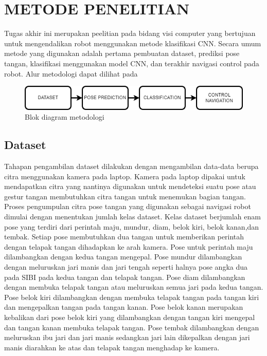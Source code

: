 \chapter{METODE PENELITIAN}
\label{chap:desainimplementasi}


Tugas akhir ini merupakan peelitian pada bidang visi computer yang bertujuan untuk mengendalikan robot menggunakan metode klasifikasi CNN. Secara umum metode yang digunakan adalah pertama pembuatan dataset, prediksi pose tangan, klasifikasi menggunakan model CNN, dan terakhir navigasi control pada robot. Alur metodologi dapat dilihat pada

\begin{figure}[!h]
  \centering
	\includegraphics[width=1\linewidth]{../Gambar/metodologi.png}
	\caption{Blok diagram metodologi}
	\label{fig:metodologi}
\end{figure}

\section{Dataset}
\label{sec:deskripsisistem}

Tahapan pengambilan dataset dilakukan dengan mengambilan data-data berupa citra menggunakan kamera pada laptop. Kamera pada laptop dipakai untuk mendapatkan citra yang nantinya digunakan untuk mendeteksi suatu pose atau gestur tangan membutuhkan citra tangan untuk menemukan bagian tangan. Proses pengumpulan citra pose tangan yang digunakan sebagai navigasi robot  dimulai dengan menentukan jumlah kelas dataset. Kelas dataset berjumlah enam pose yang terdiri dari perintah maju, mundur, diam, belok kiri, belok kanan,dan tembak. Setiap pose membutuhkan dua tangan untuk memberikan perintah dengan telapak tangan dihadapkan ke arah kamera. Pose untuk perintah maju dilambangkan dengan kedua tangan mengepal. Pose mundur dilambangkan dengan meluruskan jari manis dan jari tengah seperti halnya pose angka dua pada SIBI pada kedua tangan dan telapak tangan.  Pose diam dilambangkan dengan membuka telapak tangan atau meluruskan semua jari pada kedua tangan.  Pose belok kiri dilambangkan dengan membuka telapak tangan pada tangan kiri dan mengepalkan tangan pada tangan kanan. Pose belok kanan merupakan kebalikan dari pose belok kiri yang dilambangkan dengan tangan kiri mengepal dan tangan kanan membuka telapak tangan. Pose tembak dilambangkan dengan meluruskan ibu jari dan jari manis sedangkan jari lain dikepalkan dengan jari manis diarahkan ke atas dan telapak tangan menghadap ke kamera.

